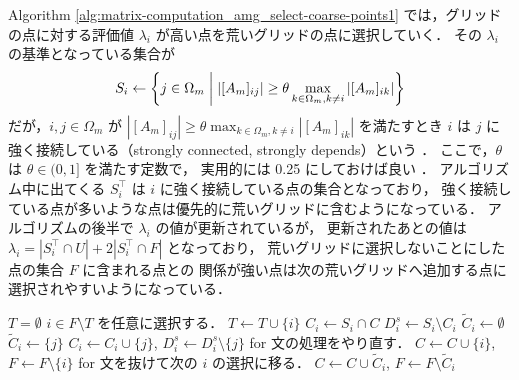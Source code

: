 Algorithm \ref{alg:matrix-computation_amg_select-coarse-points1}
では，グリッドの点に対する評価値 $\lambda_i$ が高い点を荒いグリッドの点に選択していく．
その $\lambda_i$ の基準となっている集合が
\begin{equation}
    S_i \gets \left\{j \in \Omega_m \relmiddle| %
    \left| [A_m]_{ij} \right| \ge \theta %
    \max_{k \in \Omega_m, k \neq i} \left| [A_m]_{ik} \right| \right\}
\end{equation}
だが，$i, j \in \Omega_m$ が
$\left| [A_m]_{ij} \right| \ge \theta %
    \max_{k \in \Omega_m, k \neq i} \left| [A_m]_{ik} \right|$
を満たすとき $i$ は $j$ に強く接続している（strongly connected, strongly depends）という
\cite{Ruge1987}．
ここで，$\theta$ は $\theta \in (0, 1]$ を満たす定数で，
実用的には 0.25 にしておけば良い
\cite{Ruge1987}．
アルゴリズム中に出てくる $S_i^\top$ は $i$ に強く接続している点の集合となっており，
強く接続している点が多いような点は優先的に荒いグリッドに含むようになっている．
アルゴリズムの後半で $\lambda_i$ の値が更新されているが，
更新されたあとの値は
$\lambda_i = \left|S_i^\top \cap U\right| + 2 \left|S_i^\top \cap F\right|$
となっており，
荒いグリッドに選択しないことにした点の集合 $F$ に含まれる点との
関係が強い点は次の荒いグリッドへ追加する点に選択されやすいようになっている．

\begin{algorithm}[tp]
    \caption{Algebraic Multigrid (AMG) 法における荒いグリッドの点の選択（ステップ 2）%
        （\cite{Ruge1987} をもとに一部変更）}
    \label{alg:matrix-computation_amg_select-coarse-points2}
    \begin{algorithmic}[1]
        \State $T = \emptyset$
        \State $i \in F \setminus T$ を任意に選択する．
        \State $T \gets T \cup \{i\}$
        \State $C_i \gets S_i \cap C$
        \State $D_i^s \gets S_i \setminus C_i$
        \State $\tilde{C}_i \gets \emptyset$
        \State $\tilde{C}_i \gets \{j\}$
        \State $C_i \gets C_i \cup \{j\}$, $D_i^s \gets D_i^s \setminus \{j\}$
        \State for 文の処理をやり直す．
        \Else
        \State $C \gets C \cup \{i\}$, $F \gets F \setminus \{i\}$
        \State for 文を抜けて次の $i$ の選択に移る．
        \EndIf
        \EndIf
        \EndFor
        \State $C \gets C \cup \tilde{C}_i$, $F \gets F \setminus \tilde{C}_i$
        \EndWhile
        \EndProcedure
    \end{algorithmic}
\end{algorithm}

